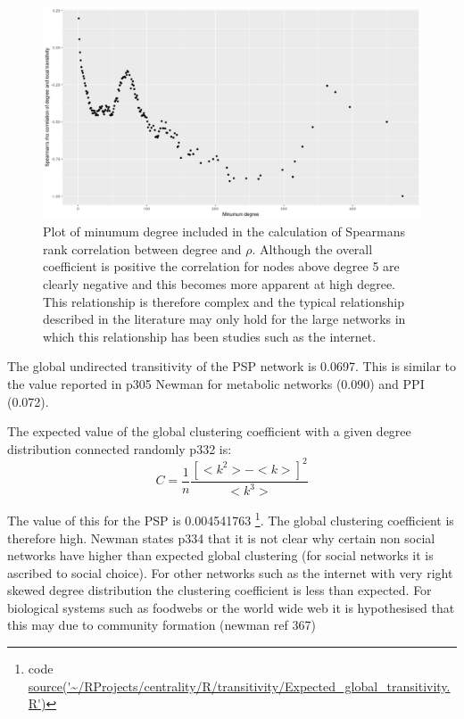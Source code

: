 \begin{figure}
    \centering
    \includegraphics[width=\textwidth]{images/Rplot01_min_degree_transitivity.png}
    \caption{Plot of minumum degree included in the calculation of Spearmans rank correlation between degree and $\rho$. Although the overall coefficient is positive the correlation for nodes above degree 5 are clearly negative and this becomes more apparent at high degree. This relationship is therefore complex and the typical relationship described in the literature may only hold for the large networks in which this relationship has been studies such as the internet. }
    \label{fig:Plot of minumum degree included in the calculation of Spearmans rank correlation between degree and rho}
\end{figure}

The global undirected transitivity of the PSP network is 0.0697. This is similar to the value reported in p305 Newman \cite{newman2018networks} for metabolic networks (0.090) and PPI (0.072).

The expected value of the global clustering coefficient with a given degree distribution connected randomly \cite{newman2018networks} p332 is:
\begin{equation}
    C=\frac{1}{n}\frac{[<k^2> - <k>]^2}{<k^3>}
\end{equation}

The value of this for the PSP is 0.004541763 \footnote{code \url{source('~/RProjects/centrality/R/transitivity/Expected_global_transitivity.R')}}. The global clustering coefficient is therefore high. Newman states p334 \cite{newman2018networks} that it is not clear why certain non social networks have higher than expected global clustering (for social networks it is ascribed to social choice). For other networks such as the internet with very right skewed degree distribution the clustering coefficient is less than expected. For biological systems such as foodwebs or the world wide web it is hypothesised that this may due to community formation (newman ref 367)

